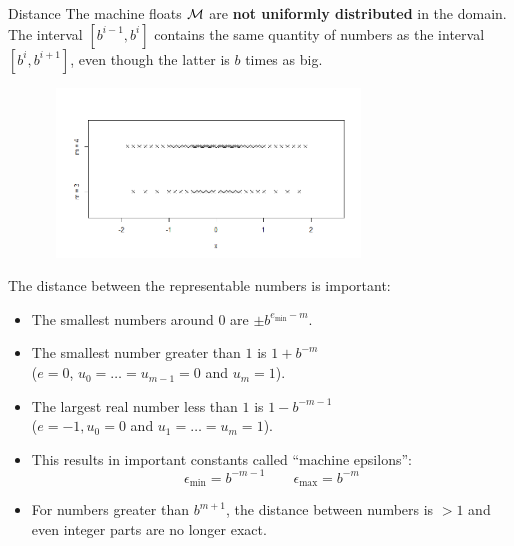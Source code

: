 \begin{vbframe}{Distance}
The machine floats $\mathcal{M}$ are \textbf{not
uniformly distributed} in the domain. The interval $[b^{i-1},b^i]$ contains the same quantity of numbers as the interval $[b^i,b^{i+1}]$, even though
the latter is $b$ times as big.

\begin{center}
\begin{figure}
  \includegraphics[height = 4.5cm, width = 8.5cm]{figure_man/Distance.png}
\end{figure}
\end{center}



\framebreak

The distance between the representable numbers is important:
\begin{itemize}
 \item The smallest numbers around $0$ are $\pm b^{e_{\min}-m}$. \\[2mm]
 \item The smallest number greater than $1$ is $1+b^{-m}$ \\
 ($e = 0$, $u_0 = \hdots = u_{m-1} = 0$ and $u_m = 1$). \\[2mm]
 \item The largest real number less than $1$ is $1-b^{-m-1}$ \\
 ($e = -1, u_0 = 0$ and $u_1 = \hdots = u_m = 1$). \\[2mm]
 \item This results in important constants called
  \enquote{machine epsilons}:
  $$
    \label{eq:2}
    \epsilon_{\min} = b^{-m-1} \qquad %
    \epsilon_{\max} = b^{-m}
  $$
 \item For numbers greater than $b^{m + 1}$, the distance between numbers is $> 1$ and even integer parts
   are no longer exact.


\end{itemize}
\end{vbframe}
